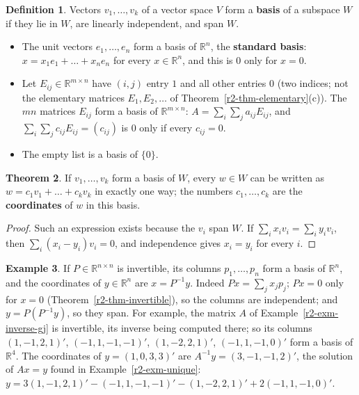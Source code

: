 \documentclass[12pt]{article}
\newcommand{\R}{\mathbb R}
\theoremstyle{definition}
\newtheorem{theorem}{Theorem}
\newtheorem{definition}[theorem]{Definition}
\newtheorem{example}[theorem]{Example}
\begin{document}
\begin{definition}\label{r3-def-basis}
Vectors \(v_1,\dots,v_k\) of a vector space \(V\) form a \textbf{basis} of a subspace \(W\) if
they lie in \(W\), are linearly independent, and span \(W\).
\begin{itemize}
\item The unit vectors \(e_1,\dots,e_n\) form a basis of \(\R^n\), the \textbf{standard basis}:
\(x=x_1e_1+\dots+x_ne_n\) for every \(x\in\R^n\), and this is \(0\) only for \(x=0\).
\item Let \(E_{ij}\in\R^{m\times n}\) have \((i,j)\) entry \(1\) and all other entries \(0\)
(two indices; not the elementary matrices \(E_1,E_2,\dots\) of Theorem~\ref{r2-thm-elementary}(c)). The \(mn\) matrices
\(E_{ij}\) form a basis of \(\R^{m\times n}\): \(A=\sum_i\sum_ja_{ij}E_{ij}\), and
\(\sum_i\sum_jc_{ij}E_{ij}=(c_{ij})\) is \(0\) only if every \(c_{ij}=0\).
\item The empty list is a basis of \(\{0\}\).
\end{itemize}
\end{definition}

\begin{theorem}\label{r3-thm-unique-coef}
If \(v_1,\dots,v_k\) form a basis of \(W\), every \(w\in W\) can be written as
\(w=c_1v_1+\dots+c_kv_k\) in exactly one way; the numbers \(c_1,\dots,c_k\) are the
\textbf{coordinates} of \(w\) in this basis.
\end{theorem}
\begin{proof}
Such an expression exists because the \(v_i\) span \(W\). If
\(\sum_ix_iv_i=\sum_iy_iv_i\), then \(\sum_i(x_i-y_i)v_i=0\), and independence gives
\(x_i=y_i\) for every \(i\).
\end{proof}

\begin{example}\label{r3-exm-invertible-basis}
If \(P\in\R^{n\times n}\) is invertible, its columns \(p_1,\dots,p_n\) form a basis of \(\R^n\),
and the coordinates of \(y\in\R^n\) are \(x=P^{-1}y\). Indeed \(Px=\sum_jx_jp_j\); \(Px=0\) only
for \(x=0\) (Theorem~\ref{r2-thm-invertible}), so the columns are independent; and
\(y=P(P^{-1}y)\), so they span. For example, the matrix \(A\) of Example~\ref{r2-exm-inverse-gj} is invertible, its
inverse being computed there; so its columns \((1,-1,2,1)'\), \((-1,1,-1,-1)'\), \((1,-2,2,1)'\),
\((-1,1,-1,0)'\) form a basis of \(\R^4\).
The coordinates of \(y=(1,0,3,3)'\) are \(A^{-1}y=(3,-1,-1,2)'\), the solution of \(Ax=y\) found in
Example~\ref{r2-exm-unique}:
\(y=3(1,-1,2,1)'-(-1,1,-1,-1)'-(1,-2,2,1)'+2(-1,1,-1,0)'\).
\end{example}
\end{document}
